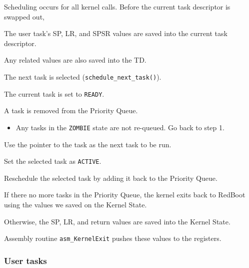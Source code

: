\documentclass[letterpaper,12pt]{article}
\begin{document}
Scheduling occurs for all kernel calls. Before the current task descriptor is swapped out,
\setcounter{listcnt0}{0}
\begin{list}{.}
{
\setlength{\rightmargin}{\leftmargin}
}

\item The user task's SP, LR, and SPSR values are saved into the current task descriptor.

\item Any related values are also saved into the TD.

\item The next task is selected (\texttt{schedule\_next\_task()}).
\setcounter{listcnt1}{0}
\begin{list}{.}
{
\setlength{\rightmargin}{\leftmargin}
}

\item The current task is set to \texttt{READY}.

\item A task is removed from the Priority Queue.
%
\begin{itemize}

\item Any tasks in the \texttt{ZOMBIE} state are not re-queued. Go back to step 1.

\end{itemize}

\item Use the pointer to the task as the next task to be run.

\item Set the selected task as \texttt{ACTIVE}.

\item Reschedule the selected task by adding it back to the Priority Queue.
\end{list}

\item If there no more tasks in the Priority Queue, the kernel exits back to RedBoot using the values we saved on the Kernel State.

\item Otherwise, the SP, LR, and return values are saved into the Kernel State.

\item Assembly routine \texttt{asm\_KernelExit} pushes these values to the registers.
\end{list}


\subsubsection{User tasks%
  \label{user-tasks}%
}
\end{document}
